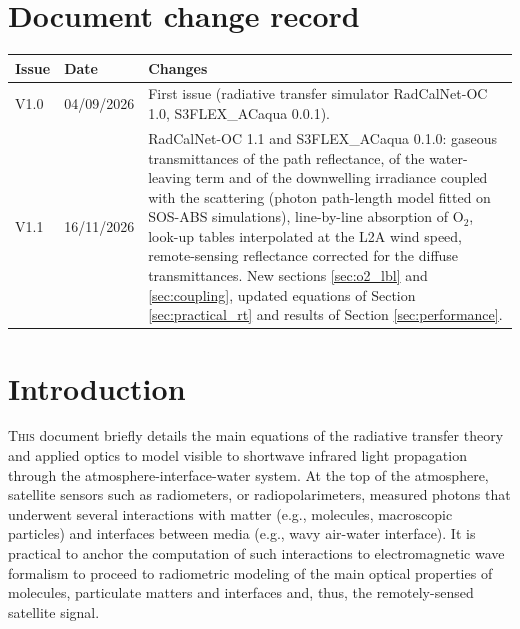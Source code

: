 \documentclass{article}
\begin{document}
\section*{Document change record}
\begin{table}[h!]
\centering
\begin{tabular}{p{1.2cm}p{2.2cm}p{11.5cm}}
\toprule
Issue & Date & Changes \\
\midrule
V1.0 & 04/09/2026 & First issue (radiative transfer simulator RadCalNet-OC 1.0, S3FLEX\_ACaqua 0.0.1). \\
V1.1 & 16/11/2026 & RadCalNet-OC 1.1 and S3FLEX\_ACaqua 0.1.0: gaseous transmittances of the path reflectance, of the
water-leaving term and of the downwelling irradiance coupled with the scattering (photon path-length model fitted on
SOS-ABS simulations), line-by-line absorption of O$_2$, look-up tables interpolated at the L2A wind speed, remote-sensing
reflectance corrected for the diffuse transmittances. New sections \ref{sec:o2_lbl} and \ref{sec:coupling}, updated
equations of Section \ref{sec:practical_rt} and results of Section \ref{sec:performance}. \\
\bottomrule
\end{tabular}
\end{table}
\clearpage  
\tableofcontents
\clearpage   
\listoffigures
\clearpage
\listoftables
\clearpage




\section{Introduction}
\lettrine{T}{his} document briefly details the main equations of the radiative transfer theory and applied optics to model visible to shortwave infrared light propagation through the atmosphere-interface-water system. At the top of the atmosphere, satellite sensors such as radiometers, or radiopolarimeters, measured photons that underwent several interactions with matter (e.g., molecules, macroscopic particles) and interfaces between media (e.g., wavy air-water interface). It is practical to anchor the computation of such interactions to electromagnetic wave formalism to proceed to radiometric modeling of the main optical properties of molecules, particulate matters and interfaces and, thus, the remotely-sensed satellite signal. 
\end{document}
